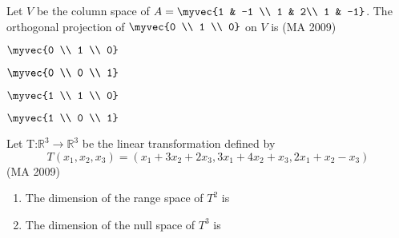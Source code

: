\item Let $V$ be the column space of $A=\myvec{1 & -1 \\ 1 & 2\\ 1 & -1}$. The orthogonal projection of $\myvec{0 \\ 1 \\ 0}$ on $V$ is
\hfill (MA 2009)
\begin{enumerate}
\begin{multicols}{4}
    \item $\myvec{0 \\ 1 \\ 0}$
    \item $\myvec{0 \\ 0 \\ 1}$
    \item $\myvec{1 \\ 1 \\ 0}$
    \item $\myvec{1 \\ 0 \\ 1}$
\end{multicols}
\end{enumerate}
\item Let T:$\mathbb{R}^3\rightarrow \mathbb{R}^3$ be the linear transformation defined by $$T(x_1,x_2,x_3)=(x_1+3x_2+2x_3,3x_1+4x_2+x_3,2x_1+x_2-x_3)$$
\hfill (MA 2009)
\begin{enumerate}
\item The dimension of the range space of $T^2$ is
\begin{enumerate}
\end{enumerate}
\item The dimension of the null space of $T^3$ is
\begin{enumerate}
\end{enumerate}
\end{enumerate}
